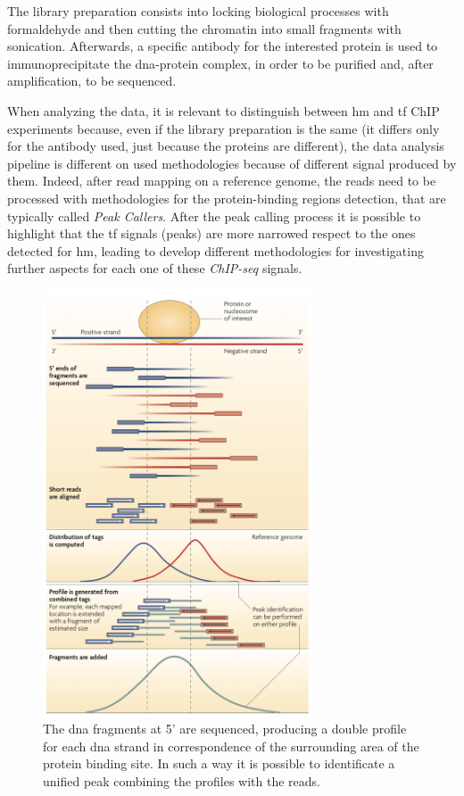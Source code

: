The library preparation consists into locking biological processes with formaldehyde and then cutting the chromatin into small fragments with sonication.
Afterwards, a specific antibody for the interested protein is used to immunoprecipitate the \gls{dna}-protein complex, in order to be purified and, after amplification, to be sequenced.

When analyzing the data, it is relevant to distinguish between \gls{hm} and \gls{tf} ChIP experiments because, even if the library preparation is the same (it differs only for the antibody used, just because the proteins are different), the data analysis pipeline is different on used methodologies because of different signal produced by them.
Indeed, after read mapping on a reference genome, the reads need to be processed with methodologies for the protein-binding regions detection, that are typically called \textit{Peak Callers}.
After the peak calling process it is possible to highlight that the \gls{tf} signals (peaks) are more narrowed respect to the ones detected for \gls{hm}, leading to develop different methodologies for investigating further aspects for each one of these \textit{ChIP-seq} signals.

\begin{figure}[H]
\centering
\includegraphics[width=8cm, keepaspectratio]{img/intro/peak_call.png}
\caption[ChIP-seq peak detection]{The \gls{dna} fragments at 5' are sequenced, producing a double profile for each \gls{dna} strand in correspondence of the surrounding area of the protein binding site.
In such a way it is possible to identificate a unified peak combining the profiles with the reads.\cite{Park2009}}
\label{fig:chipseqexp}
\end{figure}

